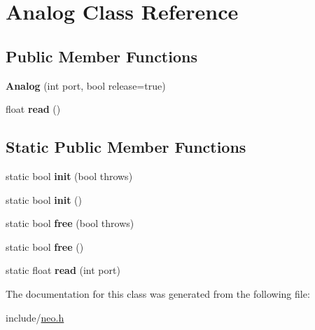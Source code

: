 \hypertarget{classAnalog}{}\section{Analog Class Reference}
\label{classAnalog}
\subsection*{Public Member Functions}
\begin{DoxyCompactItemize}
\item 
\hypertarget{classAnalog_a26af19f3d34a5542d8939ccd90fb10b7}{}\label{classAnalog_a26af19f3d34a5542d8939ccd90fb10b7} 
{\bfseries Analog} (int port, bool release=true)
\item 
\hypertarget{classAnalog_ab14afe835877c796e5b9f8dc6869e876}{}\label{classAnalog_ab14afe835877c796e5b9f8dc6869e876} 
float {\bfseries read} ()
\end{DoxyCompactItemize}
\subsection*{Static Public Member Functions}
\begin{DoxyCompactItemize}
\item 
\hypertarget{classAnalog_a7fbdcc88b5d3a37c12944b93bf89b3d2}{}\label{classAnalog_a7fbdcc88b5d3a37c12944b93bf89b3d2} 
static bool {\bfseries init} (bool throws)
\item 
\hypertarget{classAnalog_acf0b0aa3d0b8e1d11bbd01268ddf21fd}{}\label{classAnalog_acf0b0aa3d0b8e1d11bbd01268ddf21fd} 
static bool {\bfseries init} ()
\item 
\hypertarget{classAnalog_a899078b99a647ee18953a1f036d9352f}{}\label{classAnalog_a899078b99a647ee18953a1f036d9352f} 
static bool {\bfseries free} (bool throws)
\item 
\hypertarget{classAnalog_a1e13e496e54795f035f2448cc1fe3b76}{}\label{classAnalog_a1e13e496e54795f035f2448cc1fe3b76} 
static bool {\bfseries free} ()
\item 
\hypertarget{classAnalog_aa010cbb8164b8ad7202c4885eb85e2ee}{}\label{classAnalog_aa010cbb8164b8ad7202c4885eb85e2ee} 
static float {\bfseries read} (int port)
\end{DoxyCompactItemize}


The documentation for this class was generated from the following file\+:\begin{DoxyCompactItemize}
\item 
include/\hyperlink{neo_8h}{neo.\+h}\end{DoxyCompactItemize}
